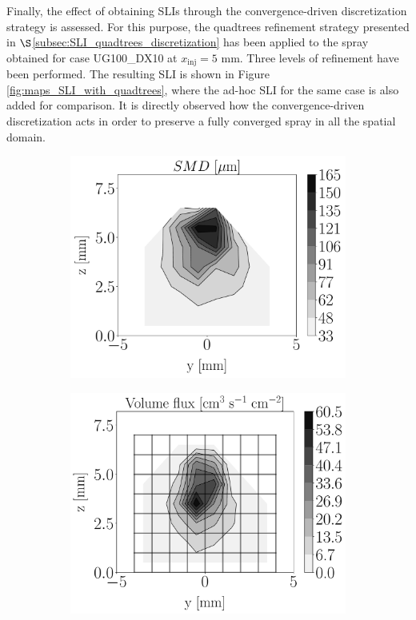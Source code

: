Finally, the effect of obtaining SLIs through the convergence-driven discretization strategy is assessed. For this purpose, the quadtrees refinement strategy presented in $\S$\ref{subsec:SLI_quadtrees_discretization} has been applied to the spray obtained for case UG100\_DX10 at $x_\mathrm{inj} = 5$ mm. Three levels of refinement have been performed. The resulting SLI is shown in Figure \ref{fig:maps_SLI_with_quadtrees}, where the ad-hoc SLI for the same case is also added for comparison. It is directly observed how the convergence-driven discretization acts in order to preserve a fully converged spray in all the spatial domain.


\begin{figure}[h!]
\flushleft
\begin{subfigure}[b]{0.2\textwidth}
	\flushleft
	\hspace*{-0.45in}
   \includegraphics[scale=0.19]{./part2_developments/figures_ch6_lagrangian_JICF/injectors_SLI/uG100_dx10_x05_SMD_map}
\end{subfigure}
\hspace*{0.075in}
\begin{subfigure}[b]{0.2\textwidth}
	\flushleft
   \includegraphics[scale=0.19]{./part2_developments/figures_ch6_lagrangian_JICF/injectors_SLI/uG100_dx10_x05_volume_flux_map}

\end{subfigure}
\end{figure}
